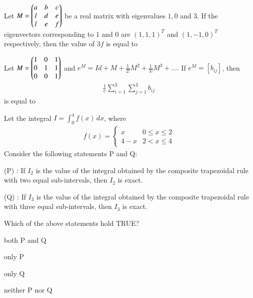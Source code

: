 \documentclass[journal]{IEEEtran}
\numberwithin{equation}{enumi}
\numberwithin{figure}{enumi}
\begin{document}
\begin{enumerate}
{\hfill{}

\item Let $M = \begin{pmatrix}a & b & c \\ l & d & e \\ l & e & f\end{pmatrix}$ be a real matrix with eigenvalues $1, 0$ and $3$. If the eigenvectors corresponding to $1$ and $0$ are $(1, 1, 1)^T$ and $(1, -1, 0)^T$ respectively, then the value of $3f$ is equal to \underline

\hfill{}

\item Let $M = \begin{pmatrix}1 & 0 & 1 \\ 0 & 1 & 1 \\ 0 & 0 & 1\end{pmatrix}$ and $e^M = Id + M + \frac{1}{2!}M^2 + \frac{1}{3!}M^3 + \dots.$ If $e^M = [b_{ij}]$, then
\begin{align*}
\frac{1}{e} \sum_{i=1}^3 \sum_{j=1}^3 b_{ij}
\end{align*}
is equal to \underline

\hfill{}

\item Let the integral $I = \int_0^4 f(x) \, dx$, where
\begin{align*}
f(x) = \begin{cases}
x & 0 \leq x \leq 2 \\
4 - x & 2 < x \leq 4
\end{cases}
\end{align*}
Consider the following statements P and Q:

(P) : If $I_2$ is the value of the integral obtained by the composite trapezoidal rule with two equal sub-intervals, then $I_2$ is exact.

(Q) : If $I_3$ is the value of the integral obtained by the composite trapezoidal rule with three equal sub-intervals, then $I_3$ is exact.

Which of the above statements hold TRUE?

\begin{enumerate}
\begin{multicols}{2}
\item both P and Q
\item only P
\item only Q
\item neither P nor Q
\end{multicols}
\end{enumerate}

\hfill{}

}
\end{enumerate}
\end{document}
